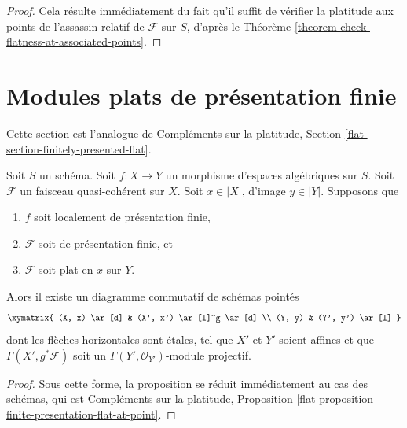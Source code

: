 \begin{proof}
Cela résulte immédiatement du fait qu'il suffit de vérifier la
platitude aux points de l'assassin relatif de $\mathcal{F}$
sur $S$, d'après le
Théorème \ref{theorem-check-flatness-at-associated-points}.
\end{proof}




\section{Modules plats de présentation finie}
\label{section-finitely-presented-flat}

\noindent
Cette section est l'analogue de Compléments sur la platitude, Section
\ref{flat-section-finitely-presented-flat}.

\begin{proposition}
\label{proposition-finite-presentation-flat-at-point}
Soit $S$ un schéma.
Soit $f : X \to Y$ un morphisme d'espaces algébriques sur $S$.
Soit $\mathcal{F}$ un faisceau quasi-cohérent sur $X$.
Soit $x \in |X|$, d'image $y \in |Y|$.
Supposons que
\begin{enumerate}
\item $f$ soit localement de présentation finie,
\item $\mathcal{F}$ soit de présentation finie, et
\item $\mathcal{F}$ soit plat en $x$ sur $Y$.
\end{enumerate}
Alors il existe un diagramme commutatif de schémas pointés
$$
\xymatrix{
(X, x) \ar[d] & (X', x') \ar[l]^g \ar[d] \\
(Y, y) & (Y', y') \ar[l]
}
$$
dont les flèches horizontales sont \'etales, tel que $X'$ et $Y'$
soient affines et que
$\Gamma(X', g^*\mathcal{F})$ soit un
$\Gamma(Y', \mathcal{O}_{Y'})$-module projectif.
\end{proposition}

\begin{proof}
Sous cette forme, la proposition se réduit immédiatement
au cas des schémas, qui est
Compléments sur la platitude, Proposition
\ref{flat-proposition-finite-presentation-flat-at-point}.
\end{proof}

